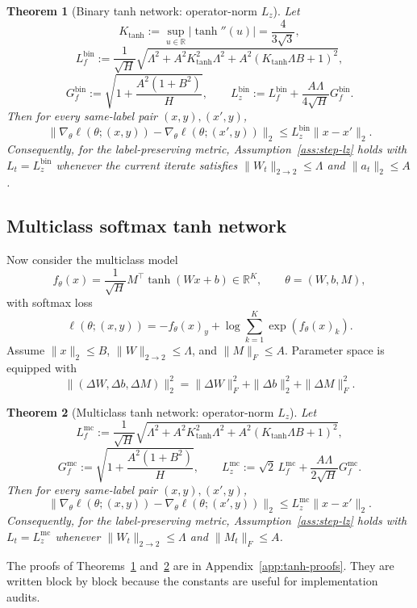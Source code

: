 \documentclass[conference,compsoc]{IEEEtran}
\newtheorem{theorem}{Theorem}
\newcommand{\R}{\mathbb{R}}
\begin{document}
\begin{theorem}[Binary tanh network: operator-norm $L_z$]
\label{thm:binary-tanh-op}
Let
\[
K_{\tanh}:=\sup_{u\in\R}|\tanh''(u)|=\frac{4}{3\sqrt 3},
\]
\[
L_f^{\mathrm{bin}}
:=
\frac{1}{\sqrt H}
\sqrt{
\Lambda^2
+A^2K_{\tanh}^2\Lambda^2
+A^2(K_{\tanh}\Lambda B+1)^2
},
\]
\[
G_f^{\mathrm{bin}}
:=\sqrt{1+\frac{A^2(1+B^2)}{H}},
\qquad
L_z^{\mathrm{bin}}
:=L_f^{\mathrm{bin}}+\frac{A\Lambda}{4\sqrt H}G_f^{\mathrm{bin}}.
\]
Then for every same-label pair $(x,y),(x',y)$,
\[
\|\nabla_\theta\ell(\theta;(x,y))-\nabla_\theta\ell(\theta;(x',y))\|_2
\le L_z^{\mathrm{bin}}\|x-x'\|_2.
\]
Consequently, for the label-preserving metric, Assumption~\ref{ass:step-lz} holds with $L_t=L_z^{\mathrm{bin}}$ whenever the current iterate satisfies $\|W_t\|_{2\to2}\le\Lambda$ and $\|a_t\|_2\le A$.
\end{theorem}

\subsection{Multiclass softmax tanh network}

Now consider the multiclass model
\[
f_\theta(x)=\frac{1}{\sqrt H}M^\top\tanh(Wx+b)\in\R^K,
\qquad
\theta=(W,b,M),
\]
with softmax loss
\[
\ell(\theta;(x,y))=-f_\theta(x)_y+\log\sum_{k=1}^K\exp(f_\theta(x)_k).
\]
Assume $\|x\|_2\le B$, $\|W\|_{2\to2}\le\Lambda$, and $\|M\|_F\le A$. Parameter space is equipped with
\[
\|(\Delta W,\Delta b,\Delta M)\|_2^2
=\|\Delta W\|_F^2+\|\Delta b\|_2^2+\|\Delta M\|_F^2.
\]

\begin{theorem}[Multiclass tanh network: operator-norm $L_z$]
\label{thm:multiclass-tanh-op}
Let
\[
L_f^{\mathrm{mc}}
:=
\frac{1}{\sqrt H}
\sqrt{
\Lambda^2
+A^2K_{\tanh}^2\Lambda^2
+A^2(K_{\tanh}\Lambda B+1)^2
},
\]
\[
G_f^{\mathrm{mc}}
:=\sqrt{1+\frac{A^2(1+B^2)}{H}},
\qquad
L_z^{\mathrm{mc}}
:=\sqrt 2\,L_f^{\mathrm{mc}}+\frac{A\Lambda}{2\sqrt H}G_f^{\mathrm{mc}}.
\]
Then for every same-label pair $(x,y),(x',y)$,
\[
\|\nabla_\theta\ell(\theta;(x,y))-\nabla_\theta\ell(\theta;(x',y))\|_2
\le L_z^{\mathrm{mc}}\|x-x'\|_2.
\]
Consequently, for the label-preserving metric, Assumption~\ref{ass:step-lz} holds with $L_t=L_z^{\mathrm{mc}}$ whenever $\|W_t\|_{2\to2}\le\Lambda$ and $\|M_t\|_F\le A$.
\end{theorem}

The proofs of Theorems~\ref{thm:binary-tanh-op} and~\ref{thm:multiclass-tanh-op} are in Appendix~\ref{app:tanh-proofs}. They are written block by block because the constants are useful for implementation audits.
\end{document}
